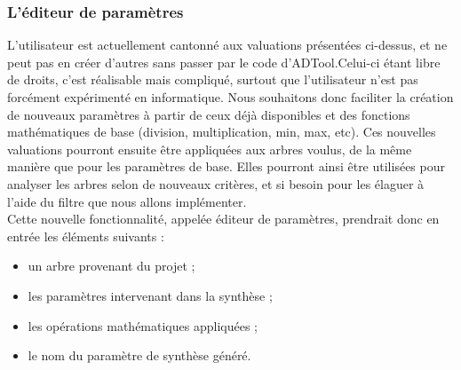 \subsubsection{L'éditeur de paramètres}

L'utilisateur est actuellement cantonné aux valuations présentées ci-dessus, et ne peut pas en créer d'autres sans passer par le code d'ADTool.Celui-ci étant libre de droits, c'est réalisable mais compliqué, surtout que l'utilisateur n'est pas forcément expérimenté en informatique. %
Nous souhaitons donc faciliter la création de nouveaux paramètres à partir de ceux déjà disponibles et des fonctions mathématiques de base (division, multiplication, min, max, etc). Ces nouvelles valuations pourront ensuite être appliquées aux arbres voulus, de la même manière que pour les paramètres de base. Elles pourront ainsi être utilisées pour analyser les arbres selon de nouveaux critères, et si besoin pour les élaguer à l'aide du filtre que nous allons implémenter.\\

Cette nouvelle fonctionnalité, appelée éditeur de paramètres, prendrait donc en entrée les éléments suivants :
\begin{itemize}[label=,font=\color{magenta},parsep=0cm,itemsep=0cm, leftmargin=0cm]
\item un arbre provenant du projet ;
\item les paramètres intervenant dans la synthèse ;
\item les opérations mathématiques appliquées ;
\item le nom du paramètre de synthèse généré.
\end{itemize}

		

